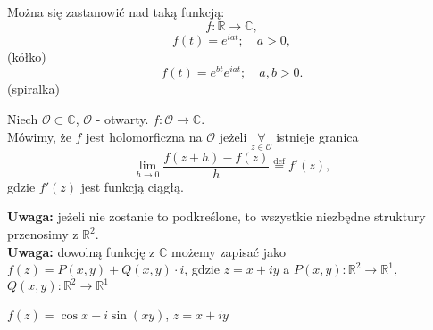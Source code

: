 \documentclass[../main.tex]{subfiles}
\begin{document}
Można się zastanowić nad taką funkcją:
\[
f : \mathbb{R}\to \mathbb{C}
,\]
\[
    f(t) = e^{iat};\quad a > 0
,\]
(kółko)
\[
    f(t) = e^{bt}e^{iat};\quad a, b > 0
.\]
(spiralka)
\begin{definicja}
    Niech $\mathcal{O}\subset\mathbb{C}$, $\mathcal{O}$ - otwarty.
    $f : \mathcal{O}\to \mathbb{C}$. \\
    Mówimy, że $f$ jest holomorficzna na $\mathcal{O}$ jeżeli $\underset{z\in \mathcal{O}}{\forall}$ istnieje granica
    \[
        \lim_{h \to 0}\frac{f(z+h) - f(z)}{h} \overset{\text{def}}{=} f'(z)
    ,\]
gdzie $f'(z)$ jest funkcją ciągłą.
\end{definicja}
\textbf{Uwaga:} jeżeli nie zostanie to podkreślone, to wszystkie niezbędne struktury przenosimy z $\mathbb{R}^2$.\\
\textbf{Uwaga:} dowolną funkcję z $\mathbb{C}$ możemy zapisać jako $f(z) = P(x,y) + Q(x,y)\cdot i$, gdzie $z = x + iy$ a $P(x,y): \mathbb{R}^2\to \mathbb{R}^1$, $Q(x,y) : \mathbb{R}^2 \to \mathbb{R}^1$
\begin{przyklad}
    $f(z) = \cos x + i \sin(xy)$, $z = x + iy$
\end{przyklad}
\end{document}
